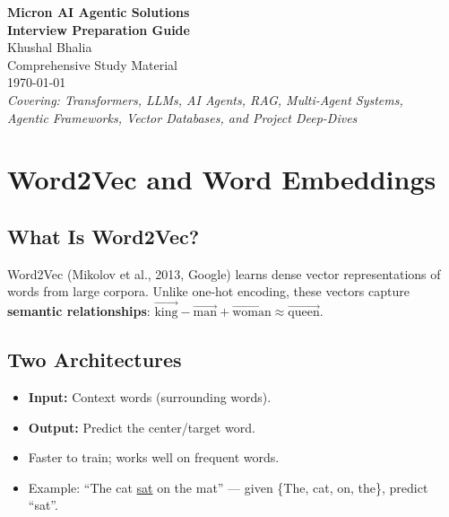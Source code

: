 \documentclass[11pt,a4paper]{article}
\begin{document}
\begin{titlepage}
\centering
\vspace*{2cm}
{\Huge\bfseries\color{sectionblue} Micron AI Agentic Solutions\\[0.3cm]
Interview Preparation Guide}\\[1.5cm]
{\Large Khushal Bhalia}\\[0.5cm]
{\large Comprehensive Study Material}\\[2cm]
{\large\today}\\[3cm]
\textit{Covering: Transformers, LLMs, AI Agents, RAG, Multi-Agent Systems,\\
Agentic Frameworks, Vector Databases, and Project Deep-Dives}
\vfill
\end{titlepage}

\tableofcontents
\newpage

\section{Word2Vec and Word Embeddings}

\subsection{What Is Word2Vec?}
Word2Vec (Mikolov et al., 2013, Google) learns dense vector representations of words from large corpora.
Unlike one-hot encoding, these vectors capture \textbf{semantic relationships}:
$\vec{\text{king}} - \vec{\text{man}} + \vec{\text{woman}} \approx \vec{\text{queen}}$.

\subsection{Two Architectures}

\begin{keybox}
\begin{itemize}[nosep]
  \item \textbf{Input:} Context words (surrounding words).
  \item \textbf{Output:} Predict the center/target word.
  \item Faster to train; works well on frequent words.
  \item Example: ``The cat \underline{sat} on the mat'' --- given \{The, cat, on, the\}, predict ``sat''.
\end{itemize}
\end{keybox}
\end{document}
